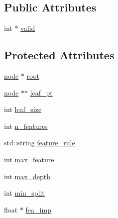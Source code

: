 \subsection*{Public Attributes}
\begin{DoxyCompactItemize}
\item 
int $\ast$ \hyperlink{classtree_afa8e539406e1f8b373b147682e3a8196}{valid}
\end{DoxyCompactItemize}
\subsection*{Protected Attributes}
\begin{DoxyCompactItemize}
\item 
\hyperlink{classnode}{node} $\ast$ \hyperlink{classtree_ad397d4906e47149b98f769b3e81473ee}{root}
\item 
\hyperlink{classnode}{node} $\ast$$\ast$ \hyperlink{classtree_ac697cf1868c26ac26f005e6ee8be9d43}{leaf\+\_\+pt}
\item 
int \hyperlink{classtree_a551919e1402a700821694297623017fc}{leaf\+\_\+size}
\item 
int \hyperlink{classtree_a48430ab4447259c35af5f22e894e1d6c}{n\+\_\+features}
\item 
std\+::string \hyperlink{classtree_a5aba3b77a347165517a20d5fab94382d}{feature\+\_\+rule}
\item 
int \hyperlink{classtree_a6f4304318f8f091f7d783ac1ec7d2775}{max\+\_\+feature}
\item 
int \hyperlink{classtree_a0a9f968fac827d3239be67488c34fb21}{max\+\_\+depth}
\item 
int \hyperlink{classtree_ae70cd626c0b50a0b8306a94a9e5e8fd7}{min\+\_\+split}
\item 
float $\ast$ \hyperlink{classtree_ad335e57b2f4f2326825694311bcc69e7}{fea\+\_\+imp}
\end{DoxyCompactItemize}


